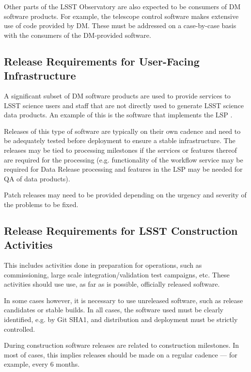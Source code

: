 Other parts of the LSST Observatory are also expected to be consumers of \gls{DM} software products.
For example, the telescope control software makes extensive use of code provided by \gls{DM}.
These must be addressed on a case-by-case basis with the consumers of the \gls{DM}-provided software.


\subsection{Release Requirements for User-Facing Infrastructure} \label{sec:infreqs}

A significant subset of \gls{DM} software products are used to provide services to \gls{LSST} science users and staff that are not directly used to generate \gls{LSST} science data products.
An example of this is the software that implements the \gls{LSP} .

Releases of this type of software are typically on their own cadence and need to be adequately tested before deployment to ensure a stable infrastructure.
The releases may be tied to processing milestones if the services or features thereof are required for the processing (e.g. functionality of the workflow service may be required for \gls{Data Release} processing and features in the \gls{LSP} may be needed for \gls{QA} of data products).

Patch releases may need to be provided depending on the urgency and severity of the problems to be fixed.


\subsection{Release Requirements for LSST Construction Activities} \label{sec:nonopsreqs}

This includes activities done in preparation for operations, such as commissioning, large scale integration/validation test campaigns, etc.
These activities should use use, as far as is possible, officially released software.

In some cases however, it is necessary to use unreleased software, such as release candidates or stable builds.
In all cases, the software used must be clearly identified, e.g. by Git SHA1, and distribution and deployment must be strictly controlled.

During construction software releases are related to construction milestones.
In most of cases, this implies releases should be made on a regular cadence --- for example, every 6 months.


